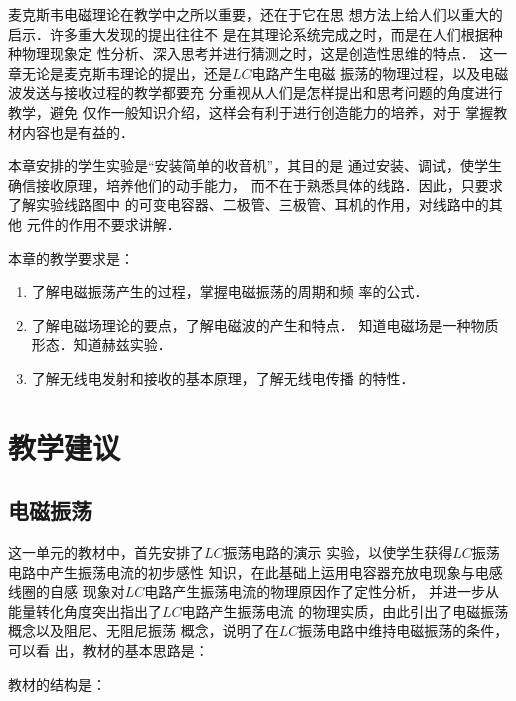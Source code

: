 麦克斯韦电磁理论在教学中之所以重要，还在于它在思
想方法上给人们以重大的启示．许多重大发现的提出往往不
是在其理论系统完成之时，而是在人们根据种种物理现象定
性分析、深入思考并进行猜测之时，这是创造性思维的特点．
这一章无论是麦克斯韦理论的提出，还是$LC$电路产生电磁
振荡的物理过程，以及电磁波发送与接收过程的教学都要充
分重视从人们是怎样提出和思考问题的角度进行教学，避免
仅作一般知识介绍，这样会有利于进行创造能力的培养，对于
掌握教材内容也是有益的．

本章安排的学生实验是“安装简单的收音机”，其目的是
通过安装、调试，使学生确信接收原理，培养他们的动手能力，
而不在于熟悉具体的线路．因此，只要求了解实验线路图中
的可变电容器、二极管、三极管、耳机的作用，对线路中的其他
元件的作用不要求讲解．

本章的教学要求是：
\begin{enumerate}
\item 了解电磁振荡产生的过程，掌握电磁振荡的周期和频
率的公式．
\item 了解电磁场理论的要点，了解电磁波的产生和特点．
知道电磁场是一种物质形态．知道赫兹实验．
\item 了解无线电发射和接收的基本原理，了解无线电传播
的特性．
\end{enumerate}

\section{教学建议}
\subsection{电磁振荡}
这一单元的教材中，首先安排了$LC$振荡电路的演示
实验，以使学生获得$LC$振荡电路中产生振荡电流的初步感性
知识，在此基础上运用电容器充放电现象与电感线圈的自感
现象对$LC$电路产生振荡电流的物理原因作了定性分析，
并进一步从能量转化角度突出指出了$LC$电路产生振荡电流
的物理实质，由此引出了电磁振荡概念以及阻尼、无阻尼振荡
概念，说明了在$LC$振荡电路中维持电磁振荡的条件，可以看
出，教材的基本思路是：
\begin{center}
\end{center}
教材的结构是：
\begin{center}
\end{center}



